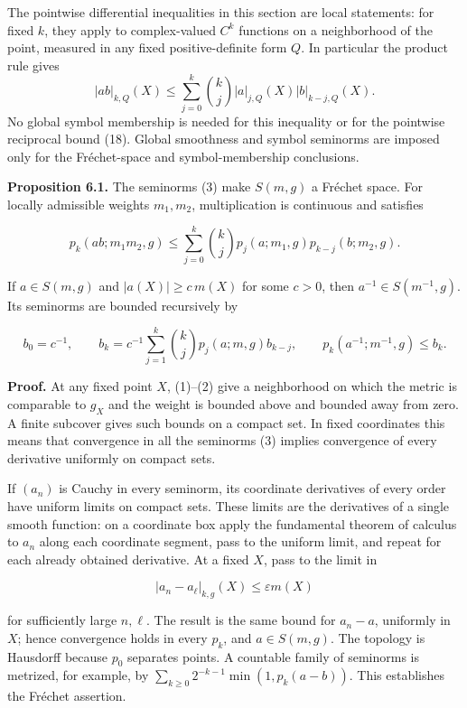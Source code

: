 \documentclass[
  11pt,
]{article}
\begin{document}
The pointwise differential inequalities in this section are local
statements: for fixed \(k\), they apply to complex-valued \(C^k\)
functions on a neighborhood of the point, measured in any fixed
positive-definite form \(Q\). In particular the product rule gives \[
|ab|_{k,Q}(X)\leq\sum_{j=0}^k\binom{k}{j}|a|_{j,Q}(X)|b|_{k-j,Q}(X).
\] No global symbol membership is needed for this inequality or for the
pointwise reciprocal bound (18). Global smoothness and symbol seminorms
are imposed only for the Fréchet-space and symbol-membership
conclusions.

\textbf{Proposition 6.1.} The seminorms (3) make \(S(m,g)\) a Fréchet
space. For locally admissible weights \(m_1,m_2\), multiplication is
continuous and satisfies

\[
p_k(ab;m_1m_2,g)
\leq\sum_{j=0}^k\binom{k}{j}
p_j(a;m_1,g)p_{k-j}(b;m_2,g).                                \tag{14}
\]

If \(a\in S(m,g)\) and \(|a(X)|\geq c\,m(X)\) for some \(c>0\), then
\(a^{-1}\in S(m^{-1},g)\). Its seminorms are bounded recursively by

\[
b_0=c^{-1},\qquad
b_k=c^{-1}\sum_{j=1}^k\binom{k}{j}p_j(a;m,g)b_{k-j},
\qquad p_k(a^{-1};m^{-1},g)\leq b_k.                         \tag{15}
\]

\textbf{Proof.} At any fixed point \(X\), (1)--(2) give a neighborhood
on which the metric is comparable to \(g_X\) and the weight is bounded
above and bounded away from zero. A finite subcover gives such bounds on
a compact set. In fixed coordinates this means that convergence in all
the seminorms (3) implies convergence of every derivative uniformly on
compact sets.

If \((a_n)\) is Cauchy in every seminorm, its coordinate derivatives of
every order have uniform limits on compact sets. These limits are the
derivatives of a single smooth function: on a coordinate box apply the
fundamental theorem of calculus to \(a_n\) along each coordinate
segment, pass to the uniform limit, and repeat for each already obtained
derivative. At a fixed \(X\), pass to the limit in

\[
|a_n-a_\ell|_{k,g}(X)\leq\varepsilon m(X)
\]

for sufficiently large \(n,\ell\). The result is the same bound for
\(a_n-a\), uniformly in \(X\); hence convergence holds in every \(p_k\),
and \(a\in S(m,g)\). The topology is Hausdorff because \(p_0\) separates
points. A countable family of seminorms is metrized, for example, by
\(\sum_{k\geq0}2^{-k-1}\min(1,p_k(a-b))\). This establishes the Fréchet
assertion.
\end{document}
